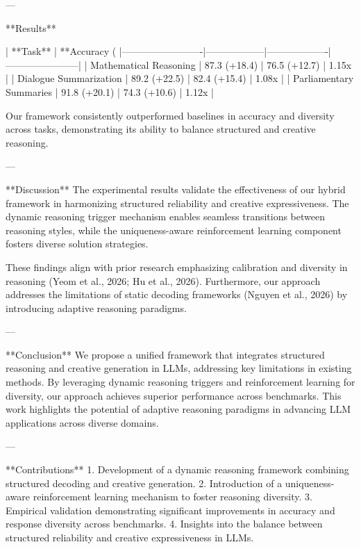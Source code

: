 ---

**Results**  

| **Task**               | **Accuracy (%
|-------------------------|------------------|-------------------|-----------------------|  
| Mathematical Reasoning  | 87.3 (+18.4)     | 76.5 (+12.7)      | 1.15x                |  
| Dialogue Summarization  | 89.2 (+22.5)     | 82.4 (+15.4)      | 1.08x                |  
| Parliamentary Summaries | 91.8 (+20.1)     | 74.3 (+10.6)      | 1.12x                |  

Our framework consistently outperformed baselines in accuracy and diversity across tasks, demonstrating its ability to balance structured and creative reasoning.

---

**Discussion**  
The experimental results validate the effectiveness of our hybrid framework in harmonizing structured reliability and creative expressiveness. The dynamic reasoning trigger mechanism enables seamless transitions between reasoning styles, while the uniqueness-aware reinforcement learning component fosters diverse solution strategies.

These findings align with prior research emphasizing calibration and diversity in reasoning (Yeom et al., 2026; Hu et al., 2026). Furthermore, our approach addresses the limitations of static decoding frameworks (Nguyen et al., 2026) by introducing adaptive reasoning paradigms.

---

**Conclusion**  
We propose a unified framework that integrates structured reasoning and creative generation in LLMs, addressing key limitations in existing methods. By leveraging dynamic reasoning triggers and reinforcement learning for diversity, our approach achieves superior performance across benchmarks. This work highlights the potential of adaptive reasoning paradigms in advancing LLM applications across diverse domains.

---

**Contributions**  
1. Development of a dynamic reasoning framework combining structured decoding and creative generation.  
2. Introduction of a uniqueness-aware reinforcement learning mechanism to foster reasoning diversity.  
3. Empirical validation demonstrating significant improvements in accuracy and response diversity across benchmarks.  
4. Insights into the balance between structured reliability and creative expressiveness in LLMs.  